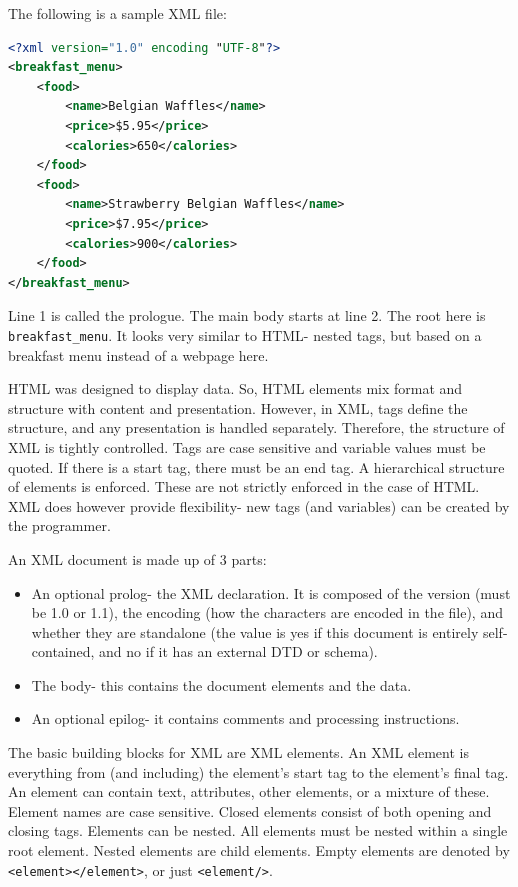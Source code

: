 \documentclass[a4paper, openany]{memoir}
\begin{document}
The following is a sample XML file:
\begin{lstlisting}[language=xml]
<?xml version="1.0" encoding "UTF-8"?>
<breakfast_menu>
    <food>
        <name>Belgian Waffles</name>
        <price>$5.95</price>
        <calories>650</calories>
    </food>
    <food>
        <name>Strawberry Belgian Waffles</name>
        <price>$7.95</price>
        <calories>900</calories>
    </food>
</breakfast_menu>
\end{lstlisting}
Line 1 is called the prologue. The main body starts at line 2. The root here is \texttt{breakfast\_menu}. It looks very similar to HTML- nested tags, but based on a breakfast menu instead of a webpage here.

HTML was designed to display data. So, HTML elements mix format and structure with content and presentation. However, in XML, tags define the structure, and any presentation is handled separately. Therefore, the structure of XML is tightly controlled. Tags are case sensitive and variable values must be quoted. If there is a start tag, there must be an end tag. A hierarchical structure of elements is enforced. These are not strictly enforced in the case of HTML. XML does however provide flexibility- new tags (and variables) can be created by the programmer.

An XML document is made up of 3 parts:
\begin{itemize}
    \item An optional prolog- the XML declaration. It is composed of the version (must be 1.0 or 1.1), the encoding (how the characters are encoded in the file), and whether they are standalone (the value is yes if this document is entirely self-contained, and no if it has an external DTD or schema).
    \item The body- this contains the document elements and the data.
    \item An optional epilog- it contains comments and processing instructions.
\end{itemize}
The basic building blocks for XML are XML elements. An XML element is everything from (and including) the element's start tag to the element's final tag. An element can contain text, attributes, other elements, or a mixture of these. Element names are case sensitive. Closed elements consist of both opening and closing tags. Elements can be nested. All elements must be nested within a single root element. Nested elements are child elements. Empty elements are denoted by \texttt{<element></element>}, or just \texttt{<element/>}.
\end{document}
